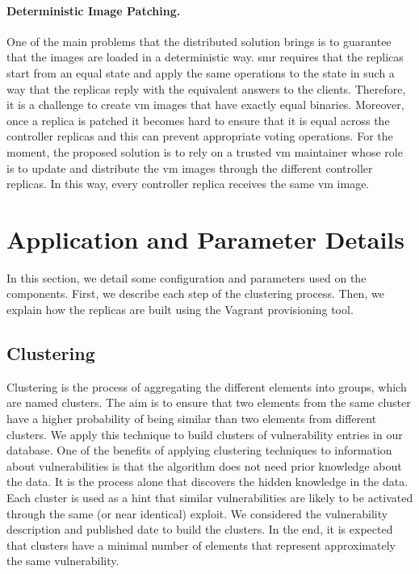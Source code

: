 \paragraph{Deterministic Image Patching.}
One of the main problems that the distributed solution brings is to guarantee that the images are loaded in a deterministic way.
\gls{smr} requires that the replicas start from an equal state and apply the same operations to the state in such a way that the replicas reply with the equivalent answers to the clients.
Therefore, it is a challenge to create \gls{vm} images that have exactly equal binaries. 
Moreover, once a replica is patched it becomes hard to ensure that it is equal across the controller replicas and this can prevent appropriate voting operations. 
For the moment, the proposed solution is to rely on a trusted \gls{vm} maintainer whose role is to update and distribute the \gls{vm} images through the different controller replicas. 
In this way, every controller replica receives the same \gls{vm} image.


\section{Application and Parameter Details}

In this section, we detail some configuration and parameters used on the \system components. 
First, we describe each step of the clustering process.
Then, we explain how the replicas are built using the Vagrant provisioning tool.


\subsection{Clustering}\label{sec:clustering}

Clustering is the process of aggregating the different elements into groups, which are named clusters. 
The aim is to ensure that two elements from the same cluster have a higher probability of being similar than two elements from different clusters. 
We apply this technique to build clusters of vulnerability entries in our database.
One of the benefits of applying clustering techniques to information about vulnerabilities is that the algorithm does not need prior knowledge about the data.
It is the process alone that discovers the hidden knowledge in the data.
Each cluster is used as a hint that similar vulnerabilities are likely to be activated through the same (or near identical) exploit.
We considered the vulnerability description and published date to build the clusters. 
In the end, it is expected that clusters have a minimal number of elements that represent approximately the same vulnerability.


